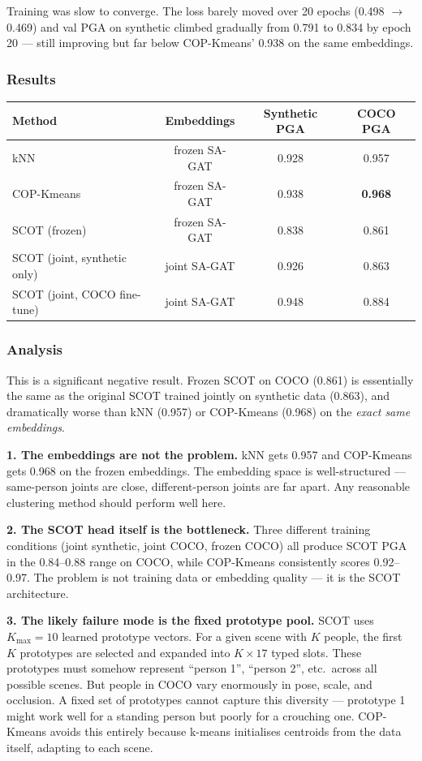 Training was slow to converge. The loss barely moved over 20 epochs (0.498 $\to$ 0.469) and val PGA on synthetic climbed gradually from 0.791 to 0.834 by epoch 20 --- still improving but far below COP-Kmeans' 0.938 on the same embeddings.

\subsubsection{Results}

\begin{tabular}{lccc}
\hline
\textbf{Method} & \textbf{Embeddings} & \textbf{Synthetic PGA} & \textbf{COCO PGA} \\
\hline
kNN & frozen SA-GAT & 0.928 & 0.957 \\
COP-Kmeans & frozen SA-GAT & 0.938 & \textbf{0.968} \\
SCOT (frozen) & frozen SA-GAT & 0.838 & 0.861 \\
\hline
SCOT (joint, synthetic only) & joint SA-GAT & 0.926 & 0.863 \\
SCOT (joint, COCO fine-tune) & joint SA-GAT & 0.948 & 0.884 \\
\hline
\end{tabular}

\vspace{0.5em}

\subsubsection{Analysis}

This is a significant negative result. Frozen SCOT on COCO (0.861) is essentially the same as the original SCOT trained jointly on synthetic data (0.863), and dramatically worse than kNN (0.957) or COP-Kmeans (0.968) on the \emph{exact same embeddings}.

\textbf{1. The embeddings are not the problem.} kNN gets 0.957 and COP-Kmeans gets 0.968 on the frozen embeddings. The embedding space is well-structured --- same-person joints are close, different-person joints are far apart. Any reasonable clustering method should perform well here.

\textbf{2. The SCOT head itself is the bottleneck.} Three different training conditions (joint synthetic, joint COCO, frozen COCO) all produce SCOT PGA in the 0.84--0.88 range on COCO, while COP-Kmeans consistently scores 0.92--0.97. The problem is not training data or embedding quality --- it is the SCOT architecture.

\textbf{3. The likely failure mode is the fixed prototype pool.} SCOT uses $K_{\text{max}} = 10$ learned prototype vectors. For a given scene with $K$ people, the first $K$ prototypes are selected and expanded into $K \times 17$ typed slots. These prototypes must somehow represent ``person 1'', ``person 2'', etc.\ across all possible scenes. But people in COCO vary enormously in pose, scale, and occlusion. A fixed set of prototypes cannot capture this diversity --- prototype 1 might work well for a standing person but poorly for a crouching one. COP-Kmeans avoids this entirely because k-means initialises centroids from the data itself, adapting to each scene.


